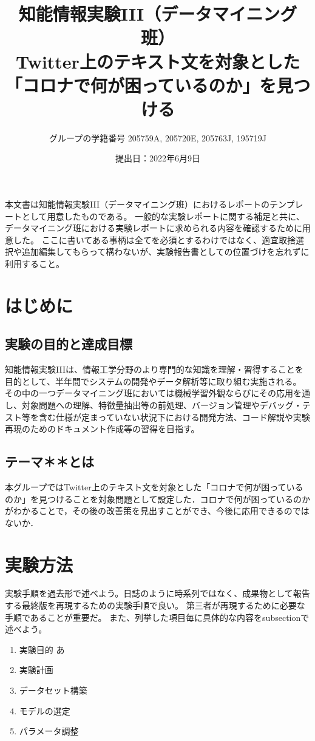 \documentclass[a4paper, 11pt, titlepage]{jsarticle}
\title{知能情報実験III（データマイニング班）\\Twitter上のテキスト文を対象とした「コロナで何が困っているのか」を見つける}
\author{グループの学籍番号 205759A, 205720E, 205763J, 195719J}
\date{提出日：2022年6月9日}
\begin{document}
\maketitle
\tableofcontents
\clearpage

本文書は知能情報実験III（データマイニング班）におけるレポートのテンプレートとして用意したものである。
一般的な実験レポートに関する補足と共に、データマイニング班における実験レポートに求められる内容を確認するために用意した。
ここに書いてある事柄は全てを必須とするわけではなく、適宜取捨選択や追加編集してもらって構わないが、実験報告書としての位置づけを忘れずに利用すること。

\section{はじめに}

\subsection{実験の目的と達成目標}
知能情報実験IIIは、情報工学分野のより専門的な知識を理解・習得することを目的として、半年間でシステムの開発やデータ解析等に取り組む実施される。
その中の一つデータマイニング班においては機械学習外観ならびにその応用を通し、対象問題への理解、特徴量抽出等の前処理、バージョン管理やデバッグ・テスト等を含む仕様が定まっていない状況下における開発方法、コード解説や実験再現のためのドキュメント作成等の習得を目指す。

\subsection{テーマ＊＊とは}
本グループではTwitter上のテキスト文を対象とした「コロナで何が困っているのか」を見つけることを対象問題として設定した．コロナで何が困っているのかがわかることで，その後の改善策を見出すことができ、今後に応用できるのではないか．

\section{実験方法}
実験手順を過去形で述べよう。日誌のように時系列ではなく、成果物として報告する最終版を再現するための実験手順で良い。
第三者が再現するために必要な手順であることが重要だ。
また、列挙した項目毎に具体的な内容をsubsectionで述べよう。


\begin{enumerate}
 \item 実験目的
 あ
 \item 実験計画
 \item データセット構築
 \item モデルの選定
 \item パラメータ調整
\end{enumerate}
\end{document}
